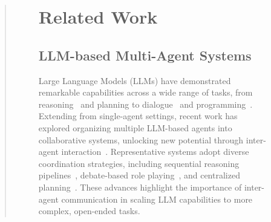 \documentclass[11pt]{article}
\begin{document}
\begin{abstract}
\begin{figure}[ht!]


%



\newpage
\clearpage
\appendix

\section{Related Work}
\subsection{LLM-based Multi-Agent Systems}
Large Language Models (LLMs) have demonstrated remarkable capabilities across a wide range of tasks, from reasoning~\cite{wang2024unleashing,wang2022self} and planning to dialogue~\cite{hu2024agentgen,yi2024survey} and programming~\cite{ishibashi2024self,zhang2024codeagent}. Extending from single-agent settings, recent work has explored organizing multiple LLM-based agents into collaborative systems, unlocking new potential through inter-agent interaction~\cite{guo2024large}. Representative systems adopt diverse coordination strategies, including sequential reasoning pipelines~\cite{wei2022chain}, debate-based role playing~\cite{li2024improving}, and centralized planning~\cite{zhuge2024gptswarm}. These advances highlight the importance of inter-agent communication in scaling LLM capabilities to more complex, open-ended tasks.

\end{figure}
\end{abstract}
\end{document}
